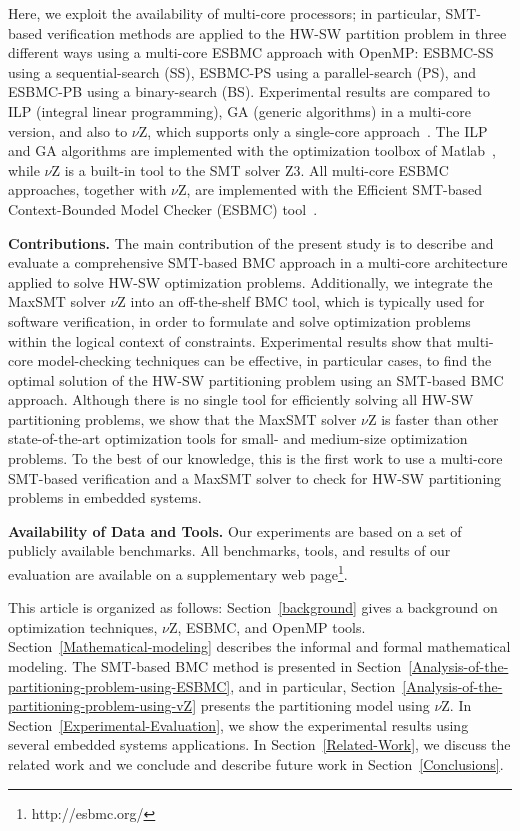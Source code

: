 Here, we exploit the availability of multi-core processors; in particular, SMT-based verification methods are applied to the HW-SW partition problem in three different ways using a multi-core ESBMC approach with OpenMP: ESBMC-SS using a sequential-search (SS), ESBMC-PS using a parallel-search (PS), and ESBMC-PB using a binary-search (BS). Experimental results are compared to ILP (integral linear programming), GA (generic algorithms) in a multi-core version, and also to $\nu$Z, which supports only a single-core approach~\cite{Bjorner2015}. The ILP and GA algorithms are implemented with the optimization toolbox of Matlab~\cite{OpenMP1998}, while $\nu$Z is a built-in tool to the SMT solver Z3. All multi-core ESBMC approaches, together with $\nu$Z, are implemented with the Efficient SMT-based Context-Bounded Model Checker (ESBMC) tool~\cite{Cordeiro2012}. 


\textbf{Contributions.} The main contribution of the present study is to describe and evaluate a comprehensive SMT-based BMC approach in a multi-core architecture applied to solve HW-SW optimization problems. Additionally, we integrate the MaxSMT solver $\nu$Z into an off-the-shelf BMC tool, which is typically used for software verification, in order to formulate and solve optimization problems within the logical context of constraints. Experimental results show that multi-core model-checking techniques can be effective, in particular cases, to find the optimal solution of the HW-SW partitioning problem using an SMT-based BMC approach. Although there is no single tool for efficiently solving all HW-SW partitioning problems, we show that the MaxSMT solver $\nu$Z is faster than other state-of-the-art optimization tools for small- and medium-size optimization problems.  To the best of our knowledge, this is the first work to use a multi-core SMT-based verification and a MaxSMT solver to check for HW-SW partitioning problems in embedded systems.

\textbf{Availability of Data and Tools. }Our experiments are based on a set of publicly available benchmarks. All benchmarks, tools, and results of our evaluation are available on a supplementary web page\footnote{http://esbmc.org/}.

This article is organized as follows: Section~\ref{background} gives a background on optimization techniques, $\nu$Z, ESBMC, and OpenMP tools. 
Section~\ref{Mathematical-modeling} describes the informal and formal mathematical modeling. The SMT-based BMC method is presented in Section~\ref{Analysis-of-the-partitioning-problem-using-ESBMC}, and in particular, Section~\ref{Analysis-of-the-partitioning-problem-using-vZ} presents the partitioning model using $\nu$Z. In Section~\ref{Experimental-Evaluation}, we show the experimental results using several embedded systems applications. In Section~\ref{Related-Work}, we discuss the related work and we conclude and describe future work in Section~\ref{Conclusions}.

